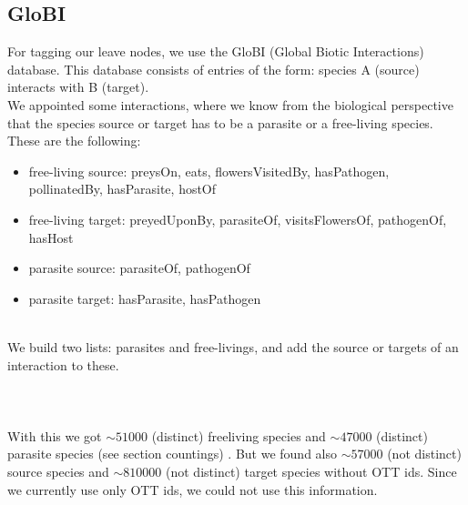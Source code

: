     \subsection{GloBI}
      For tagging our leave nodes, we use the GloBI (Global Biotic Interactions) database. This database 
        consists of entries of the form: species A (source) interacts with B (target). \\
      We appointed some interactions, where we know from the biological perspective that the species 
      source or target has to be a parasite or a free-living species. These are the following:
      \begin{itemize}
        \item free-living source: preysOn, eats, flowersVisitedBy, hasPathogen, pollinatedBy, 
          hasParasite, hostOf
        \item free-living target: preyedUponBy, parasiteOf, visitsFlowersOf, pathogenOf, hasHost
        \item parasite source: parasiteOf, pathogenOf
        \item parasite target: hasParasite, hasPathogen
      \end{itemize}
       \\
      We build two lists: parasites and free-livings, and add the source or targets of an interaction
        to these. \\
       \\
       \\ \\
      
      With this we got $\sim 51000$ (distinct) freeliving species and $\sim 47000$ (distinct) parasite 
        species (see section countings) . But we found also  $\sim 57000$ (not 
        distinct) source species and $\sim 810000$ (not distinct) target species without OTT ids. 
        Since we currently use only OTT ids, we could not use this information. \\

